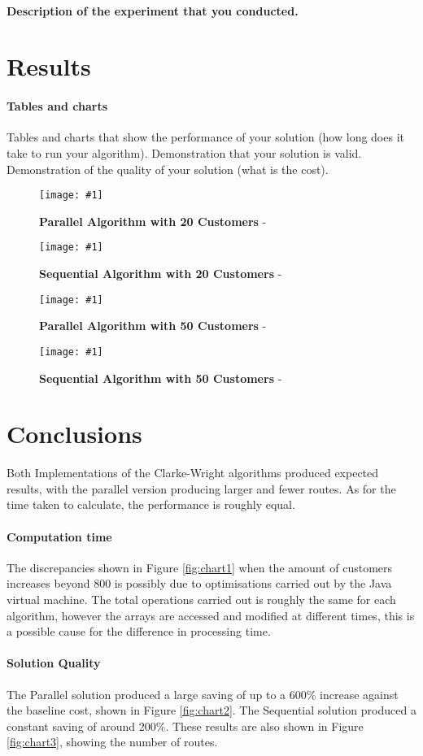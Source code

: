 \documentclass[conference]{acmsiggraph}
\newcommand{\figuremacroW}[4]{
	\begin{figure}[h] %
		\centering
		\texttt{[image: \#1]}
		\caption[#2]{\textbf{#2} - #3}
		\label{fig:#1}
	\end{figure}
}
\begin{document}
\paragraph{Description of the experiment that you conducted.}

\section{Results}

\paragraph{Tables and charts}
Tables and charts that show the performance of your solution (how long does it take to run your algorithm).
Demonstration that your solution is valid.
Demonstration of the quality of your solution (what is the cost).

\figuremacroW
{rand00020cwpsn}
{Parallel Algorithm with 20 Customers}
{}
{0.8}

\figuremacroW
{rand00020cwsn}
{Sequential Algorithm with 20 Customers}
{}
{0.8}

\figuremacroW
{rand00050cwpsn}
{Parallel Algorithm with 50 Customers}
{}
{0.8}

\figuremacroW
{rand00050cwsn}
{Sequential Algorithm with 50 Customers}
{}
{0.8}


\section{Conclusions}

Both Implementations of the Clarke-Wright algorithms produced expected results, with the parallel version producing larger and fewer routes. As for the time taken to calculate, the performance is roughly equal.
 
\paragraph{Computation time}
The discrepancies shown in Figure \ref{fig:chart1} when the amount of customers increases beyond 800 is possibly due to optimisations carried out by the Java virtual machine. The total operations carried out is roughly the same for each algorithm, however the arrays are accessed and modified at different times, this is a possible cause for the difference in processing time.

\paragraph{Solution Quality}
The Parallel solution produced a large saving of up to a 600\% increase against the baseline cost, shown in Figure \ref{fig:chart2}. The Sequential solution produced a constant saving of around 200\%. These results are also shown in Figure \ref{fig:chart3}, showing the number of routes.
\end{document}
